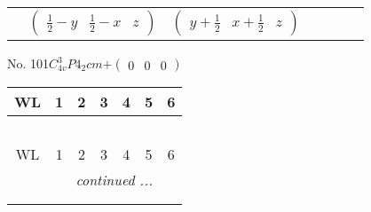\documentclass[fleqn,9pt,landscape]{jsarticle}
\begin{document}
\begin{center}
\begin{longtable}{ccccccc}
& $ \begin{pmatrix} \frac{1}{2} - y & \frac{1}{2} - x & z \end{pmatrix} $ & $ \begin{pmatrix} y + \frac{1}{2} & x + \frac{1}{2} & z \end{pmatrix} $ & $  $ & $  $ & $  $ & $  $ \\
\end{longtable}
\end{center}
\newpage
No. 101\quad$C_{4v}^{3}$\quad$P4_2cm$\quad[ tetragonal ]\quad$+\begin{pmatrix} 0 & 0 & 0 \end{pmatrix}$
\begin{center}
\renewcommand{\arraystretch}{1.2}
\begin{longtable}{ccccccc}
 \hline \hline
WL & 1 & 2 & 3 & 4 & 5 & 6 \\ \hline \endfirsthead

\multicolumn{6}{l}{\tablename\ \thetable{}} \\
 \hline \hline
WL & 1 & 2 & 3 & 4 & 5 & 6 \\ \hline \endhead

 \hline \hline
\multicolumn{6}{r}{\footnotesize\it continued ...} \\ \endfoot

 \hline \hline
\multicolumn{6}{r}{} \\ \endlastfoot


\end{longtable}
\end{center}
\end{document}
